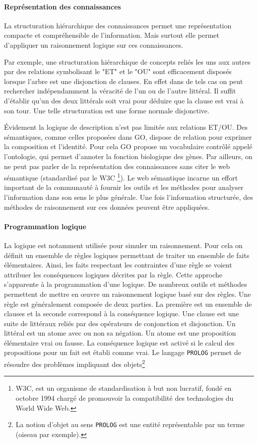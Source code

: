 \begin{refsegment}
    \paragraph{Représentation des connaissances}
    La structuration hiérarchique des connaissances permet une représentation compacte et compréhensible de l'information. Mais surtout elle permet d'appliquer un raisonnement logique sur ces connaissances.
    
    Par exemple, une structuration hiérarchique de concepts reliés les uns aux autres par des relations symbolisant le "ET" et le "OU" sont efficacement disposés lorsque l'arbre est une disjonction de clauses.
    En effet dans de tels cas on peut rechercher indépendamment la véracité de l'un ou de l'autre littéral. Il suffit d'établir qu'un des deux littérals soit vrai pour déduire que la clause est vrai à son tour. Une telle structuration est une forme normale disjonctive.
    
    Évidement la logique de description n'est pas limitée aux relations ET/OU. Des sémantiques, comme celles proposées dans \acrfull{GO}, dispose de relation pour exprimer la composition et l'identité. Pour cela  \acrfull{GO} propose un vocabulaire contrôlé appelé l'ontologie, qui permet d’annoter la fonction biologique des gènes. Par ailleurs, on ne peut pas parler de la représentation des connaissances sans citer le web sémantique (standardisé par le W3C \footnote{W3C, est un organisme de standardisation à but non lucratif, fondé en octobre 1994 chargé de promouvoir la compatibilité des technologies du World Wide Web.}). Le web sémantique incarne un effort important de la communauté à fournir les outils et les méthodes pour analyser l'information dans son sens le plus générale. Une fois l'information structurée, des méthodes de raisonnement sur ces données peuvent être appliquées.
    
    \paragraph{Programmation logique}
    La logique est notamment utilisée pour simuler un raisonnement. Pour cela on définit un ensemble de règles logiques permettant de traiter un ensemble de faits élémentaires. Ainsi, les faits respectant les contraintes d'une règle se voient attribuer les conséquences logiques décrites par la règle. Cette approche s'apparente à la programmation d'une logique. De nombreux outils et méthodes permettent de mettre en œuvre un raisonnement logique basé sur des règles. Une règle est généralement composée de deux parties. La première est un ensemble de clauses et la seconde correspond à la conséquence logique.
    Une clause est une suite de littéraux reliés par des opérateurs de conjonction et disjonction. Un littéral est un atome avec ou non sa négation. Un atome est une proposition élémentaire vrai ou fausse. La conséquence logique est activé si le calcul des propositions pour un fait est établi comme vrai. Le langage \texttt{PROLOG} \cite{colmerauer1990introduction,clocksin2003programming} permet de résoudre des problèmes impliquant des objets\footnote{La notion d'objet au sens \texttt{PROLOG} est une entité représentable par un terme (oiseau par exemple). }
    

\end{refsegment}
